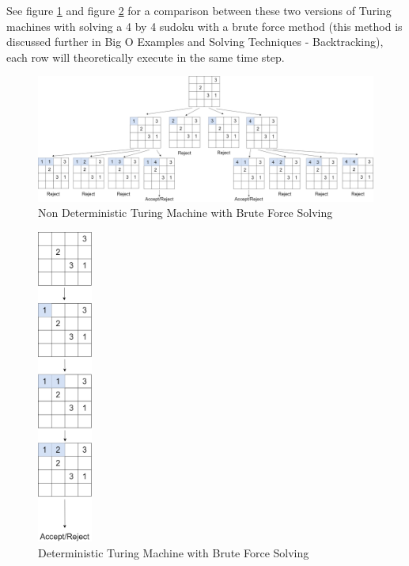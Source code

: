 \documentclass[a4paper,11pt]{report}
\newcounter{row}
\begin{document}
See figure \ref{ndtm} and figure \ref{dtm} for a comparison between these two versions of Turing machines with solving a 4 by 4 sudoku with a brute force method (this method is discussed further in Big O Examples and Solving Techniques - Backtracking), each row will theoretically execute in the same time step.

\begin{figure}[h!]
	\begin{center}
		\includegraphics[width=180mm]{figures/turing_non_determinism.png}
	\end{center}
	\caption{\label{ndtm} Non Deterministic Turing Machine with Brute Force Solving}
\end{figure}

\begin{figure}[h!]
	\begin{center}
		\includegraphics[width=18mm]{figures/turing_determinism.png}
	\end{center}
	\caption{\label{dtm} Deterministic Turing Machine with Brute Force Solving}
\end{figure}
\end{document}
